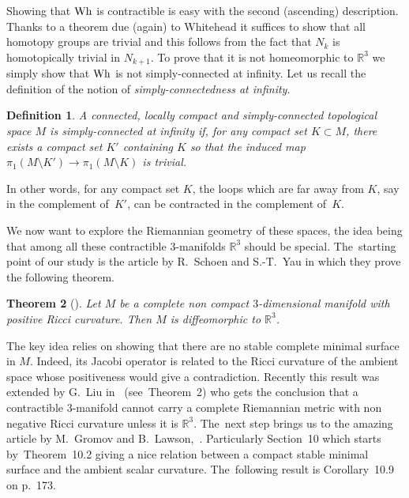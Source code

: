 \documentclass[pdftex]{sigma}
\numberwithin{equation}{section}
\newtheorem{theor}{Theorem}[section]
\newtheorem{defi}[theor]{Definition}
\begin{document}
Showing that $\rm Wh$ is contractible is easy with the second (ascending) description. Thanks to a theorem due (again) to Whitehead it suffices to show that all homotopy groups are trivial and this follows from the fact that $N_k$ is homotopically trivial in $N_{k+1}$. To prove that it is not homeomorphic to $\mathbb{R}^{3}$ we simply show that $\rm Wh$ is not simply-connected at infinity. Let us recall the definition of the notion of {\it simply-connectedness at infinity}.

\begin{defi}
A connected, locally compact and simply-connected topological space $M$ is \emph{simply-connected at infinity} if, for any compact set $K\subset M$, there exists a compact set $K'$ containing $K$ so that the induced map $\pi_{1}(M\setminus K')\rightarrow \pi_{1}(M\setminus K)$ is trivial.
\end{defi}

In other words, for any compact set $K$, the loops which are far away from $K$, say in the complement of~$K'$, can be contracted in the complement
of~$K$.


We now want to explore the Riemannian geometry of these spaces, the idea being that among all these contractible $3$-manifolds $\mathbb{R}^{3}$ should be special. The~starting point of our study is the article
\cite{SchoenYau:stable} by R.~Schoen and S.-T.~Yau in which they prove the following theorem.

\begin{theor}[{\cite[Theorem~3]{SchoenYau:stable}}]
Let $M$ be a complete non compact $3$-dimensional manifold with positive Ricci curvature. Then $M$ is diffeomorphic to $\mathbb{R}^{3}$.
\end{theor}

The key idea relies on showing that there are no stable complete minimal surface in $M$. \mbox{Indeed}, its Jacobi operator is related to the Ricci curvature of the ambient space whose positiveness would give a contradiction. Recently this result was extended by G.~Liu in~\cite{Liu} (see~Theorem~2)
who gets the conclusion that a contractible $3$-manifold cannot carry a complete Riemannian metric with non negative Ricci curvature unless it is $\mathbb{R}^{3}$. The~next step brings us to the amazing article by M.~Gromov and B.~Lawson,~\cite{GromovLawson}. Particularly Section~10 which starts by~Theorem~10.2 giving a nice relation between a compact stable minimal surface and the ambient scalar curvature. The~following result is Corollary~10.9 on p.~173.
\end{document}
